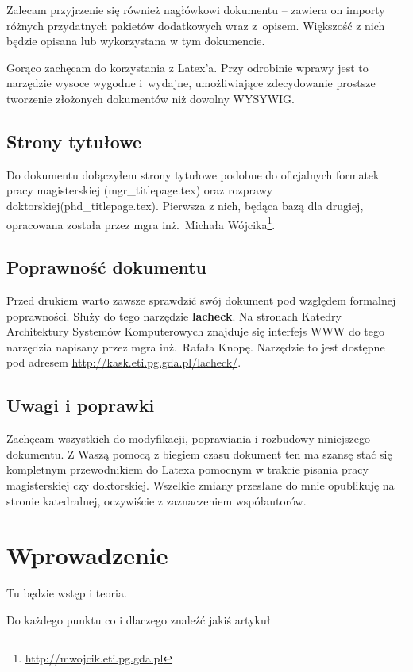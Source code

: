 \documentclass[twoside,a4paper]{book}
\begin{document}
Zalecam przyjrzenie się również nagłówkowi dokumentu -- zawiera on importy różnych przydatnych pakietów dodatkowych wraz z~opisem. Większość z nich będzie opisana lub wykorzystana w tym dokumencie.

Gorąco zachęcam do korzystania z Latex'a. Przy odrobinie wprawy jest to narzędzie wysoce wygodne i~wydajne, umożliwiające zdecydowanie prostsze tworzenie złożonych dokumentów niż dowolny WYSYWIG\@.

\section{Strony tytułowe}

Do dokumentu dołączyłem strony tytułowe podobne do oficjalnych formatek pracy magisterskiej (mgr\_titlepage.tex) oraz rozprawy doktorskiej(phd\_titlepage.tex). Pierwsza z nich, będąca bazą dla drugiej, opracowana została przez mgra inż.\ Michała Wójcika\footnote{\url{http://mwojcik.eti.pg.gda.pl}}.

\section{Poprawność dokumentu}

Przed drukiem warto zawsze sprawdzić swój dokument pod względem formalnej poprawności. Służy do tego narzędzie \textbf{lacheck}. Na stronach Katedry Architektury Systemów Komputerowych znajduje się interfejs WWW do tego narzędzia napisany przez mgra inż.\ Rafała Knopę. Narzędzie to jest dostępne pod adresem \url{http://kask.eti.pg.gda.pl/lacheck/}.

\section{Uwagi i poprawki}

Zachęcam wszystkich do modyfikacji, poprawiania i rozbudowy niniejszego dokumentu. Z Waszą pomocą z biegiem czasu dokument ten ma szansę stać się kompletnym przewodnikiem do Latexa pomocnym w trakcie pisania pracy magisterskiej czy doktorskiej. Wszelkie zmiany przesłane do mnie opublikuję na stronie katedralnej, oczywiście z zaznaczeniem współautorów.

\chapter{Wprowadzenie}
Tu będzie wstęp i teoria.

Do każdego punktu co i dlaczego znaleźć jakiś artykuł
\end{document}
